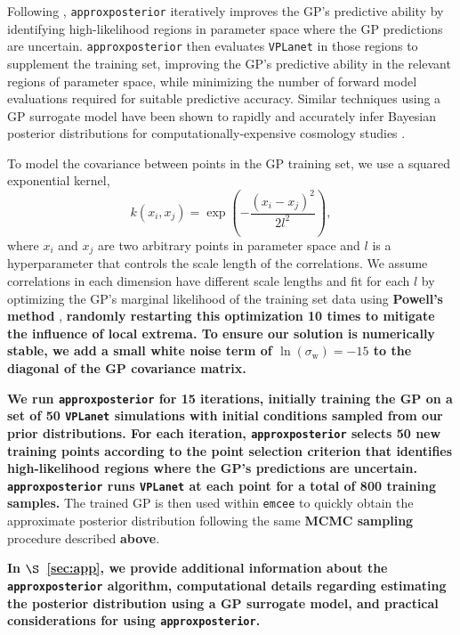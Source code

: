 \documentclass[twocolumn]{aastex62}
\newcommand{\xxx}[1]{{\textbf{#1}}}
\newcommand{\vplanet}[0]{\texttt{VPLanet}\xspace}
\newcommand{\emcee}[0]{\texttt{emcee}\xspace}
\newcommand{\approxposterior}[0]{\texttt{approxposterior}\xspace}
\begin{document}
Following \citet{Kandasamy2017}, \approxposterior iteratively improves the GP's predictive ability by identifying high-likelihood regions in parameter space where the GP predictions are uncertain. \approxposterior then evaluates \vplanet in those regions to supplement the training set, improving the GP's predictive ability in the relevant regions of parameter space, while minimizing the number of forward model evaluations required for suitable predictive accuracy. Similar techniques using a GP surrogate model have been shown to rapidly and accurately infer Bayesian posterior distributions for computationally-expensive cosmology studies \citep[e.g.][]{Bird2019}. 

To model the covariance between points in the GP training set, we use a squared exponential kernel,
\begin{equation} \label{eqn:kernel}
k(x_i, x_j) = \exp \left( - \frac{(x_i - x_j)^2}{2l^2} \right),
\end{equation}
where $x_i$ and $x_j$ are two arbitrary points in parameter space and $l$ is a hyperparameter that controls the scale length of the correlations. We assume correlations in each dimension have different scale lengths and fit for each $l$ by optimizing the GP's marginal likelihood of the training set data using \xxx{Powell's method} \citep{Powell1964}, \xxx{randomly restarting this optimization 10 times to mitigate the influence of local extrema. To ensure our solution is numerically stable, we add a small white noise term of $\ln(\sigma_{\mathrm{w}}) = -15$ to the diagonal of the GP covariance matrix.} 

\xxx{We run \approxposterior for 15 iterations, initially training the GP on a set of 50 \vplanet simulations with initial conditions sampled from our prior distributions. For each iteration, \approxposterior selects 50 new training points according to the \citet{Kandasamy2017} point selection criterion that identifies high-likelihood regions where the GP's predictions are uncertain. \approxposterior runs \vplanet at each point for a total of 800 training samples.} The trained GP is then used within \emcee to quickly obtain the approximate posterior distribution following the same \xxx{MCMC sampling} procedure described \xxx{above}. 

\xxx{In $\S$~\ref{sec:app}, we provide additional information about the \approxposterior algorithm, computational details regarding estimating the posterior distribution using a GP surrogate model, and practical considerations for using \approxposterior.}
\end{document}
